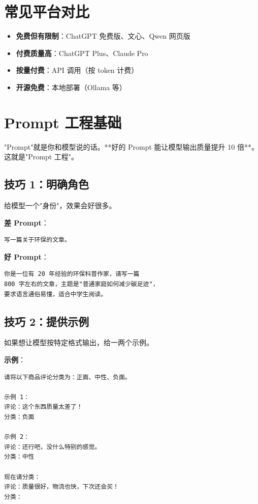 \documentclass[12pt,UTF8]{ctexbook}
\begin{document}
\section{常见平台对比}

\begin{itemize}
  \item \textbf{免费但有限制}：ChatGPT 免费版、文心、Qwen 网页版
  \item \textbf{付费质量高}：ChatGPT Plus、Claude Pro
  \item \textbf{按量付费}：API 调用（按 token 计费）
  \item \textbf{开源免费}：本地部署（Ollama 等）
\end{itemize}

\section{Prompt 工程基础}

"Prompt"就是你和模型说的话。**好的 Prompt 能让模型输出质量提升 10 倍**。这就是"Prompt 工程"。

\subsection{技巧 1：明确角色}

给模型一个"身份"，效果会好很多。

\textbf{差 Prompt}：
\begin{verbatim}
写一篇关于环保的文章。
\end{verbatim}

\textbf{好 Prompt}：
\begin{verbatim}
你是一位有 20 年经验的环保科普作家，请写一篇
800 字左右的文章，主题是"普通家庭如何减少碳足迹"，
要求语言通俗易懂，适合中学生阅读。
\end{verbatim}

\subsection{技巧 2：提供示例}

如果想让模型按特定格式输出，给一两个示例。

\textbf{示例}：
\begin{verbatim}
请将以下商品评论分类为：正面、中性、负面。

示例 1：
评论：这个东西质量太差了！
分类：负面

示例 2：
评论：还行吧，没什么特别的感觉。
分类：中性

现在请分类：
评论：质量很好，物流也快，下次还会买！
分类：
\end{verbatim}
\end{document}
